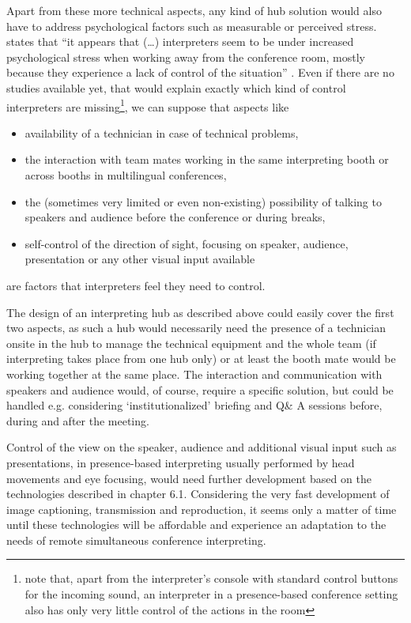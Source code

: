 \documentclass[output=paper]{langsci/langscibook}
\begin{document}
Apart from these more technical aspects, any kind of hub solution would also have to address psychological factors such as measurable or perceived stress. \citet{Moser-Mercer2005} states that “it appears that (…) interpreters seem to be under increased psychological stress when working away from the conference room, mostly because they experience a lack of control of the situation” \citep[15]{Moser-Mercer2005}. Even if there are no studies available yet, that would explain exactly which kind of control interpreters are missing\footnote{note that, apart from the interpreter’s console with standard control buttons for the incoming sound, an interpreter in a presence-based conference setting also has only very little control of the actions in the room}, we can suppose that aspects like

\begin{itemize}
\item availability of a technician in case of technical problems,
\item the interaction with team mates working in the same interpreting booth or across booths in multilingual conferences,
\item the (sometimes very limited or even non-existing) possibility of talking to speakers and audience before the conference or during breaks,
\item self-control of the direction of sight, focusing on speaker, audience, presentation or any other visual input available
\end{itemize}

are factors that interpreters feel they need to control.

The design of an interpreting hub as described above could easily cover the first two aspects, as such a hub would necessarily need the presence of a technician onsite in the hub to manage the technical equipment and the whole team (if interpreting takes place from one hub only) or at least the booth mate would be working together at the same place. 
The interaction and communication with speakers and audience would, of course, require a specific solution, but could be handled e.g. considering ‘institutionalized’ briefing and Q\& A sessions before, during and after the meeting.

Control of the view on the speaker, audience and additional visual input such as presentations, in presence-based interpreting usually performed by head movements and eye focusing, would need further development based on the technologies described in chapter 6.1. Considering the very fast development of image captioning, transmission and reproduction, it seems only a matter of time until these technologies will be affordable and experience an adaptation to the needs of remote simultaneous conference interpreting. 
\end{document}

